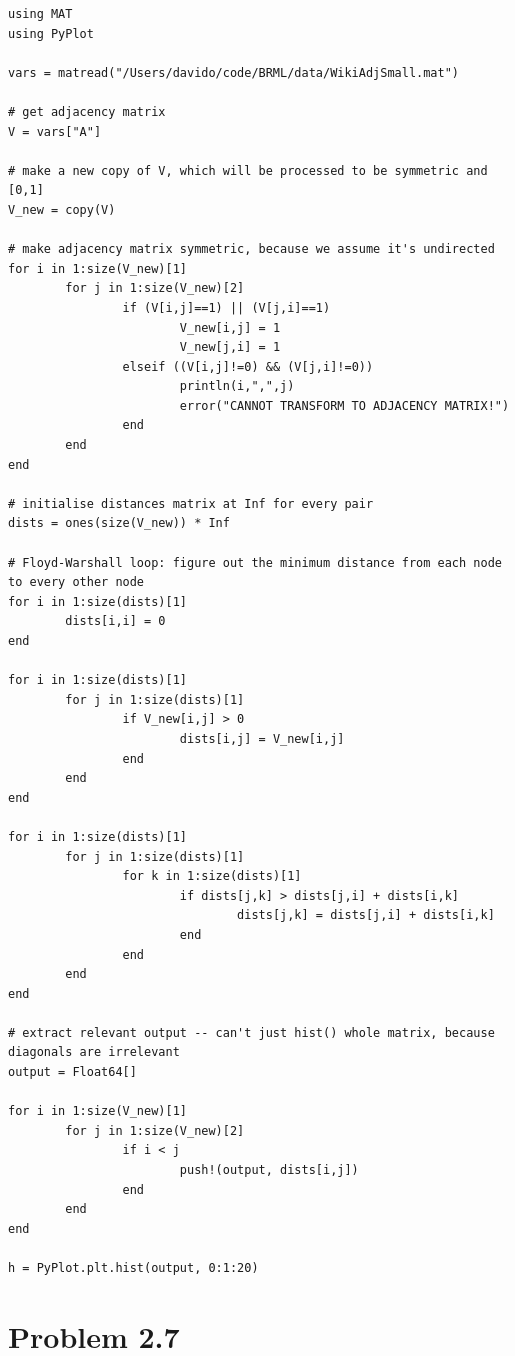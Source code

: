 \documentclass[11pt,a4paper,oneside]{report}
\begin{document}
\begin{lstlisting}
using MAT
using PyPlot

vars = matread("/Users/davido/code/BRML/data/WikiAdjSmall.mat")

# get adjacency matrix
V = vars["A"]

# make a new copy of V, which will be processed to be symmetric and [0,1]
V_new = copy(V)

# make adjacency matrix symmetric, because we assume it's undirected
for i in 1:size(V_new)[1]
        for j in 1:size(V_new)[2]
                if (V[i,j]==1) || (V[j,i]==1)
                        V_new[i,j] = 1
                        V_new[j,i] = 1
                elseif ((V[i,j]!=0) && (V[j,i]!=0))
                        println(i,",",j)
                        error("CANNOT TRANSFORM TO ADJACENCY MATRIX!")
                end
        end
end

# initialise distances matrix at Inf for every pair
dists = ones(size(V_new)) * Inf

# Floyd-Warshall loop: figure out the minimum distance from each node to every other node
for i in 1:size(dists)[1]
        dists[i,i] = 0
end

for i in 1:size(dists)[1]
        for j in 1:size(dists)[1]
                if V_new[i,j] > 0
                        dists[i,j] = V_new[i,j]
                end
        end
end

for i in 1:size(dists)[1]
        for j in 1:size(dists)[1]
                for k in 1:size(dists)[1]
                        if dists[j,k] > dists[j,i] + dists[i,k]
                                dists[j,k] = dists[j,i] + dists[i,k]
                        end
                end
        end
end

# extract relevant output -- can't just hist() whole matrix, because diagonals are irrelevant
output = Float64[]

for i in 1:size(V_new)[1]
        for j in 1:size(V_new)[2]
                if i < j
                        push!(output, dists[i,j])
                end
        end
end

h = PyPlot.plt.hist(output, 0:1:20)

\end{lstlisting}

\section*{Problem 2.7}
\end{document}
